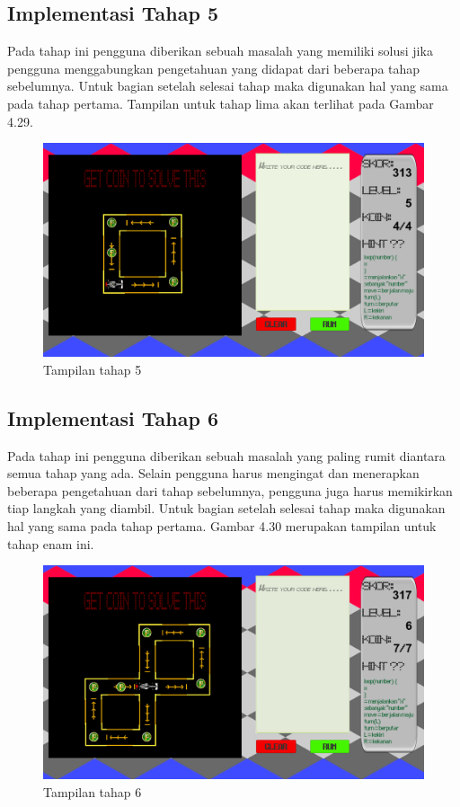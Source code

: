 	\subsection{Implementasi Tahap 5}
	Pada tahap ini pengguna diberikan sebuah masalah yang memiliki solusi jika pengguna menggabungkan pengetahuan yang didapat dari beberapa tahap sebelumnya. Untuk bagian setelah selesai tahap maka digunakan hal yang sama pada tahap pertama. Tampilan untuk tahap lima akan terlihat pada Gambar 4.29.
	\begin{figure}
		\centering
		\includegraphics[width=\linewidth-40pt]{pics/prototipe/tahap5}
		\caption{Tampilan tahap 5}
	\end{figure}
	\subsection{Implementasi Tahap 6}
	Pada tahap ini pengguna diberikan sebuah masalah yang paling rumit diantara semua tahap yang ada. Selain pengguna harus mengingat dan menerapkan beberapa pengetahuan dari tahap sebelumnya, pengguna juga harus memikirkan tiap langkah yang diambil. Untuk bagian setelah selesai tahap maka digunakan hal yang sama pada tahap pertama. Gambar 4.30 merupakan tampilan untuk tahap enam ini.
	\begin{figure}
		\centering						
		\includegraphics[width=\linewidth-40pt]{pics/prototipe/tahap6}
		\caption{Tampilan tahap 6}
		
	\end{figure}

